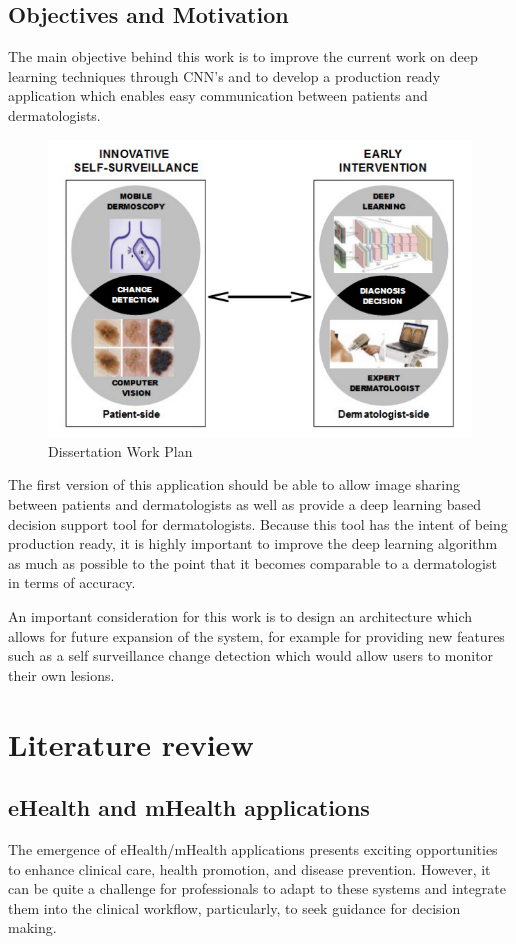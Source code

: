 \documentclass[journal,compsoc]{IEEEtran}
\begin{document}
\subsection{Objectives and Motivation}
The main objective behind this work is to improve the current work on deep learning techniques through CNN's and to develop a production ready application which enables easy communication between patients and dermatologists.
\begin{figure}[h]
  \centering
    \includegraphics[scale=0.5, width=\linewidth]{figures/Dissertation_Plan.png}
  \caption{Dissertation Work Plan}
\end{figure}
The first version of this application should be able to allow image sharing between patients and dermatologists as well as provide a deep learning based decision support tool for dermatologists. Because this tool has the intent of being production ready, it is highly important to improve the deep learning algorithm as much as possible to the point that it becomes comparable to a dermatologist in terms of accuracy. \par 
An important consideration for this work is to design an architecture which allows for future expansion of the system, for example for providing new features such as a self surveillance change detection which would allow users to monitor their own lesions.  
\section{Literature review}
\subsection{eHealth and mHealth applications}
The emergence of eHealth/mHealth applications presents exciting opportunities to enhance clinical care, health promotion, and disease prevention. However, it can be quite a challenge for professionals to adapt to these systems and integrate them into the clinical workflow, particularly, to seek guidance for decision making.
\end{document}
